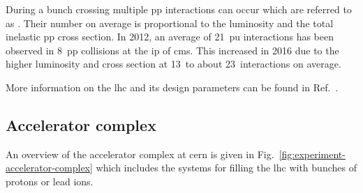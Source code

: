
During a bunch crossing multiple \acrlong{pp} interactions can occur which are referred to as . Their number on average is proportional to the luminosity and the total inelastic \gls{pp} cross section. In 2012, an average of 21~\acrlong{pu} interactions has been observed in 8~\TeV \gls{pp} collisions at the \gls{ip} of \gls{cms}. This increased in 2016 due to the higher luminosity and cross section at 13~\TeV to about 23~interactions on average.


More information on the \gls{lhc} and its design parameters can be found in Ref.~\cite{Evans:2008zzb}.



\subsection{Accelerator complex}

An overview of the accelerator complex at \gls{cern} is given in Fig.~\ref{fig:experiment-accelerator-complex} which includes the systems for filling the \gls{lhc} with bunches of protons or lead ions.


